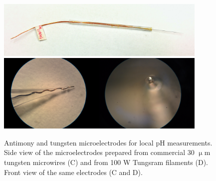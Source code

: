 \begin{figure}
\centering
\includegraphics[width=0.9\textwidth]{img/sb_top.jpg}
\includegraphics[width=0.45\textwidth]{img/wolfram_electrode1.jpg}\includegraphics[width=0.45\textwidth]{img/wolfram_electrode2.jpg}

\caption[Antimony and tungsten microelectrodes for local pH measurements.]{Antimony and tungsten microelectrodes for local pH measurements.
Side view of the microelectrodes prepared from commercial 30 $\upmu$m tungsten microwires (C) and from 100 W Tungsram filaments (D).
Front view of the same electrodes (C and D).}
\label{fig:tungsten_electrode}
\end{figure}

